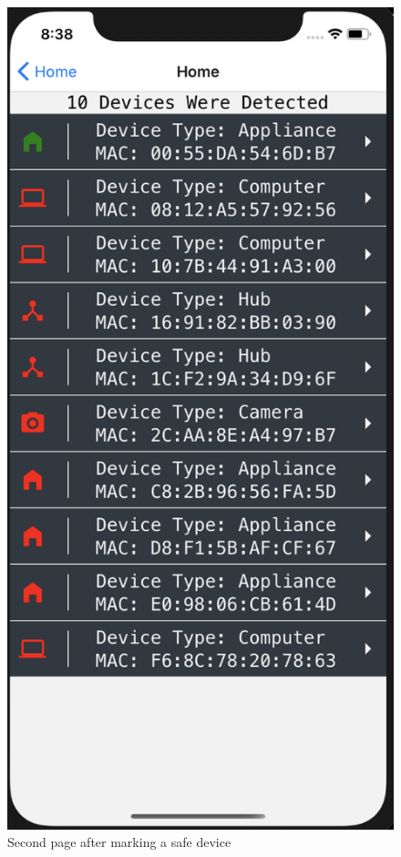 \documentclass{article}
\begin{document}
\begin{figure}[hbtp]
    \centering
    \includegraphics[scale=0.65]{frontEnd/listScreenSafe.png}
    \caption{Second page after marking a safe device} 
\end{figure}
\pagebreak
\end{document}

